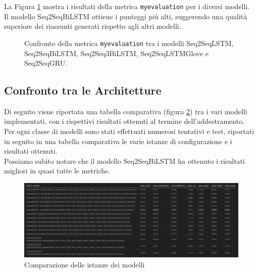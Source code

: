 La Figura \ref{fig:myevaluation_comparison} mostra i risultati della metrica \texttt{myevaluation} per i diversi modelli.\\
Il modello Seq2SeqBiLSTM ottiene i punteggi pi\`u alti, suggerendo una qualit\`a superiore dei riassunti generati rispetto agli altri modelli.
\begin{figure}[H]
    \centering
    \hfill
    \hfill
    \hfill
    \hfill
    \hfill

    \caption{Confronto della metrica \texttt{myevaluation} tra i modelli Seq2SeqLSTM, Seq2SeqBiLSTM, Seq2Seq3BiLSTM, Seq2SeqLSTMGlove e Seq2SeqGRU.}
    \label{fig:myevaluation_comparison}
\end{figure}

\subsection{Confronto tra le Architetture}
Di seguito viene riportata una tabella comparativa (figura \ref{fig:models_comparison_instances}) tra i vari modelli implementati, con i rispettivi risultati ottenuti al termine dell'addestramento.\\
Per ogni classe di modelli sono stati effettuati numerosi tentativi e test, riportati in seguito in una tabella comparativa le varie istanze di configurazione e i risultati ottenuti.\\
Possiamo subito notare che il modello Seq2SeqBiLSTM ha ottenuto i risultati migliori in quasi tutte le metriche.
\begin{figure}[H]
    \centering
    \includegraphics[width=1\textwidth]{media/models_comparison_instances.png}
    \caption{Comparazione delle istanze dei modelli}
    \label{fig:models_comparison_instances}
\end{figure}
  
